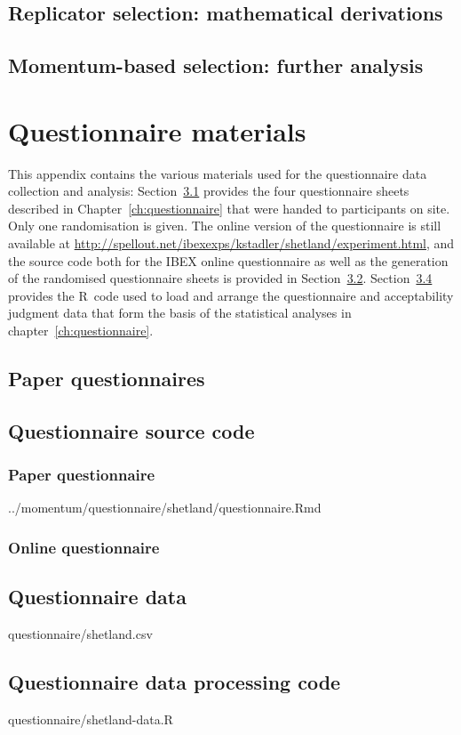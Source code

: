 \documentclass[oneside]{book}
\newcommand{\includeR}[1]{#1}
\begin{document}
\section{Replicator selection: mathematical derivations}
\label{app:usm}
%

\section{Momentum-based selection: further analysis}
\label{app:momentum}
%

\chapter{Questionnaire materials}
\label{app:questionnaire}
This appendix contains the various materials used for the questionnaire data collection and analysis: Section~\ref{app:paperquestionnaire} provides the four questionnaire sheets described in Chapter~\ref{ch:questionnaire} that were handed to participants on site. Only one randomisation is given. The online version of the questionnaire is still available at \url{http://spellout.net/ibexexps/kstadler/shetland/experiment.html}, and the source code both for the IBEX online questionnaire as well as the generation of the randomised questionnaire sheets is provided in Section~\ref{app:questionnairecode}. Section~\ref{app:questionnairedatacode} provides the R~code used to load and arrange the questionnaire and acceptability judgment data that form the basis of the statistical analyses in chapter~\ref{ch:questionnaire}.

\section{Paper questionnaires}
\label{app:paperquestionnaire}
%
\section{Questionnaire source code}
\label{app:questionnairecode}
\subsection{Paper questionnaire}

\includeR{../momentum/questionnaire/shetland/questionnaire.Rmd}
\subsection{Online questionnaire}

\section{Questionnaire data}
\includeR{questionnaire/shetland.csv}

\section{Questionnaire data processing code}
\label{app:questionnairedatacode}

\includeR{questionnaire/shetland-data.R}
\end{document}
